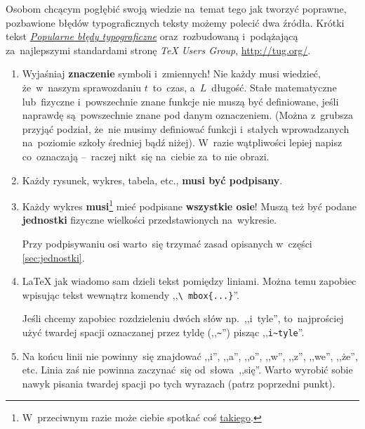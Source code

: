 \documentclass[a4paper,11pt]{article}
\newcommand{\tbs}{\textbackslash}  %
\newcommand{\tb}{\textbf}
\begin{document}
Osobom chcącym pogłębić swoją wiedzie na~temat tego jak tworzyć
poprawne, pozbawione błędów typograficznych teksty możemy polecić dwa
źródła. Krótki tekst
\href{http://artisan-studio.pl/popularne-bledy-typograficzne-czyli-jak-unikac-bykow}{\emph{Popularne
    błędy typograficzne}} oraz~rozbudowaną i~podążającą za~najlepszymi
standardami stronę \emph{\TeX{} Users Group},
\href{http://tug.org/}{http://tug.org/}.

\begin{enumerate}
\item Wyjaśniaj \textbf{znaczenie} symboli i~zmiennych! Nie każdy musi
  wiedzieć, że~w~naszym sprawozdaniu $t$~to~czas, a~$L$~długość. Stałe
  matematyczne lub~fizyczne i~powszechnie znane funkcje nie muszą być
  definiowane, jeśli naprawdę są~powszechnie znane pod danym
  oznaczeniem. (Można z~grubsza przyjąć podział, że~nie musimy
  definiować funkcji i~stałych wprowadzanych na~poziomie szkoły
  średniej bądź niżej). W~razie wątpliwości lepiej napisz co~oznaczają
  --~raczej nikt~się na~ciebie za~to nie obrazi.
\item Każdy rysunek, wykres, tabela, etc., \textbf{musi być
    podpisany}.
\item Każdy wykres \tb{musi}\footnote{W~przeciwnym razie może ciebie
    spotkać coś \href{https://xkcd.com/833/}{takiego}.} mieć podpisane
  \textbf{wszystkie osie}! Muszą też być podane \tb{jednostki}
  fizyczne wielkości przedstawionych na~wykresie.

  Przy podpisywaniu osi warto~się trzymać zasad opisanych w~części
  \eqref{sec:jednostki}.
\item \LaTeX{} jak wiadomo sam dzieli tekst pomiędzy liniami. Można
  temu zapobiec wpisując tekst wewnątrz komendy ,,\texttt{\tbs
    mbox\{...\}}''.

  Jeśli chcemy zapobiec rozdzieleniu dwóch słów np.~,,i~tyle'',
  to~najprościej użyć twardej spacji oznaczanej przez tyldę
  (,,\verb+~+'') pisząc ,,\verb+i~tyle+''.
\item Na końcu linii nie powinny~się znajdować ,,i'', ,,a'', ,,o'',
  ,,w'', ,,z'', ,,we'', ,,że'', etc. Linia zaś nie powinna
  zaczynać~się od~słowa~,,się''. Warto wyrobić sobie nawyk pisania
  twardej spacji po tych wyrazach (patrz poprzedni punkt).


\end{enumerate}
\end{document}

